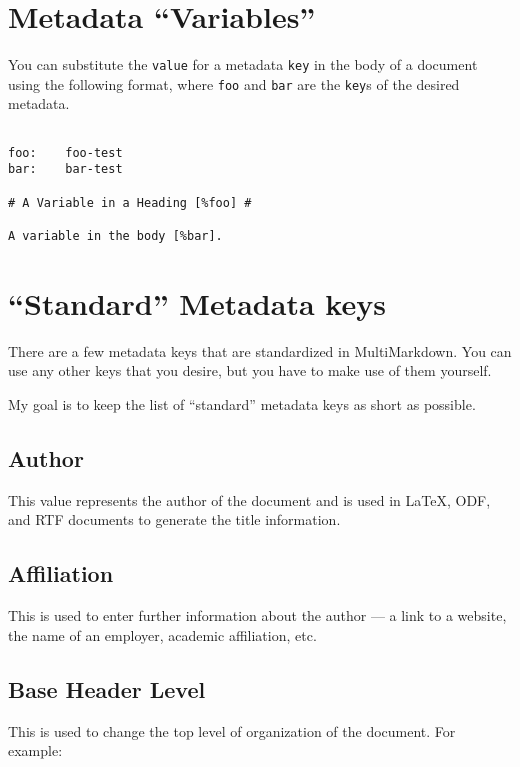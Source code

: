 \section{Metadata ``Variables''}
\label{metadatavariables}

You can substitute the \texttt{value} for a metadata \texttt{key} in the body of a document using the following format, where \texttt{foo} and \texttt{bar} are the \texttt{key}s of the desired metadata.

\begin{verbatim}

foo:	foo-test
bar:	bar-test

# A Variable in a Heading [%foo] #

A variable in the body [%bar].
\end{verbatim}

\section{``Standard'' Metadata keys}
\label{standardmetadatakeys}

There are a few metadata keys that are standardized in MultiMarkdown. You can
use any other keys that you desire, but you have to make use of them yourself.

My goal is to keep the list of ``standard'' metadata keys as short as possible.

\subsection{Author}
\label{author}

This value represents the author of the document and is used in LaTeX, ODF, and RTF
documents to generate the title information.

\subsection{Affiliation}
\label{affiliation}

This is used to enter further information about the author --- a link to a
website, the name of an employer, academic affiliation, etc.

\subsection{Base Header Level}
\label{baseheaderlevel}

This is used to change the top level of organization of the document. For example:


